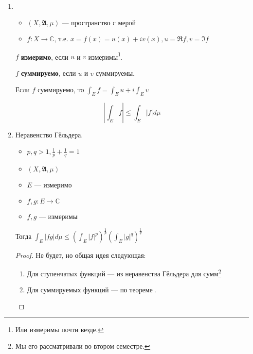 \begin{enumerate}
    \item %
          \begin{itemize}
              \item \((X, \mathfrak{A}, \mu)\) --- пространство с мерой
              \item \(f : X \to \mathbb{C}\), т.е. \(x = f(x) = u(x) + iv(x), u = \Re f, v = \Im f\)
          \end{itemize}

          \(f\) \textbf{измеримо}, если \(u\) и \(v\) измеримы\footnote{Или измеримы почти везде.}.

          \(f\) \textbf{суммируемо}, если \(u\) и \(v\) суммируемы.

          Если \(f\) суммируемо, то \(\int_E f = \int_E u + i \int_E v\)

          \begin{exercise}
              \[\left|\int_E f\right| \leq \int_E |f| d\mu\]
          \end{exercise}

    \item %
          Неравенство Гёльдера.

          \begin{itemize}
              \item \(p, q > 1, \frac{1}{p} + \frac{1}{q} = 1\)
              \item \((X, \mathfrak{A}, \mu)\)
              \item \(E\) --- измеримо
              \item \(f, g : E \to \mathbb{C}\)
              \item \(f, g\) --- измеримы
          \end{itemize}

          Тогда \(\int_E |fg| d\mu \leq \left( \int_E |f|^p \right)^{\frac{1}{p}} \left( \int_E |g|^q \right)^{\frac{1}{q}}\)
          \begin{proof}
              Не будет, но общая идея следующая:
              \begin{enumerate}
                  \item Для ступенчатых функций --- из неравенства Гёльдера для сумм\footnote{Мы его рассматривали во втором семестре.}
                  \item Для суммируемых функций --- по теореме .
              \end{enumerate}
          \end{proof}


\end{enumerate}
